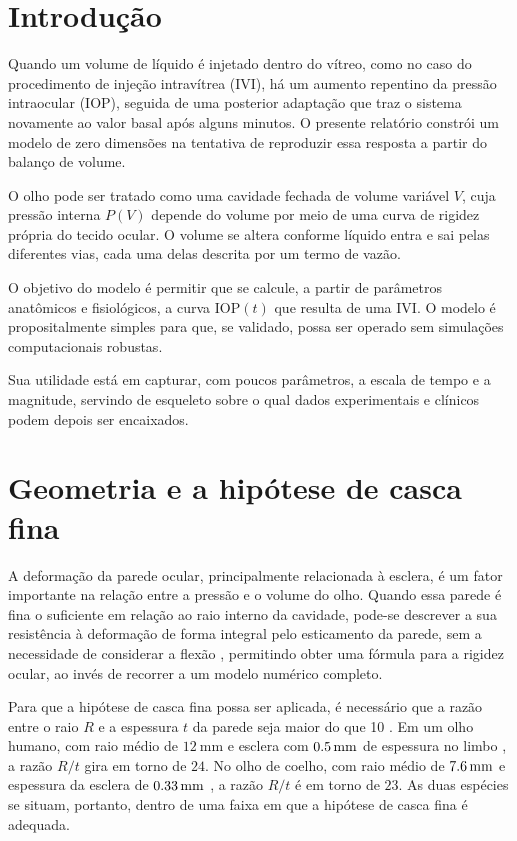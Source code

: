 \section{Introdução}

Quando um volume de líquido é injetado dentro do vítreo, como no caso do procedimento de injeção intravítrea (IVI), há um aumento repentino da pressão intraocular (IOP), seguida de uma posterior adaptação que traz o sistema novamente ao valor basal após alguns minutos. O presente relatório constrói um modelo de zero dimensões na tentativa de reproduzir essa resposta a partir do balanço de volume. 

O olho pode ser tratado como uma cavidade fechada de volume variável $V$, cuja pressão interna $P(V)$ depende do volume por meio de uma curva de rigidez própria do tecido ocular. O volume se altera conforme líquido entra e sai pelas diferentes vias, cada uma delas descrita por um termo de vazão.

O objetivo do modelo é permitir que se calcule, a partir de parâmetros anatômicos e fisiológicos, a curva $\mathrm{IOP}(t)$ que resulta de uma IVI. O modelo é propositalmente simples para que, se validado, possa ser operado sem simulações computacionais robustas. 

Sua utilidade está em capturar, com poucos parâmetros, a escala de tempo e a magnitude, servindo de esqueleto sobre o qual dados experimentais e clínicos podem depois ser encaixados.

\section{Geometria e a hipótese de casca fina}
\label{sec:geometria}

A deformação da parede ocular, principalmente relacionada à esclera, é um fator importante na relação entre a pressão e o volume do olho. Quando essa parede é fina o suficiente em relação ao raio interno da cavidade, pode-se descrever a sua resistência à deformação de forma integral pelo esticamento da parede, sem a necessidade de considerar a flexão \citep{timoshenko1959}, permitindo obter uma fórmula para a rigidez ocular, ao invés de recorrer a um modelo numérico completo.

Para que a hipótese de casca fina possa ser aplicada, é necessário que a razão entre o raio $R$ e a espessura $t$ da parede seja maior do que 10 \citep{timoshenko1959}. Em um olho humano, com raio médio de $\SI{12}{\milli\meter}$ \citep{moosajee2023} e esclera com $\SI{0{,}5}{\milli\meter}$ de espessura no limbo \citep{vurgese2012}, a razão $R/t$ gira em torno de $24$. No olho de coelho, com raio médio de $\SI{7{,}6}{\milli\meter}$ \citep{bozkir1997, missel2012, lamminsalo2018} e espessura da esclera de $\SI{0{,}33}{\milli\meter}$ \citep{missel2012, zhang2014cxl, lamminsalo2018}, a razão $R/t$ é em torno de $23$. As duas espécies se situam, portanto, dentro de uma faixa em que a hipótese de casca fina é adequada.

